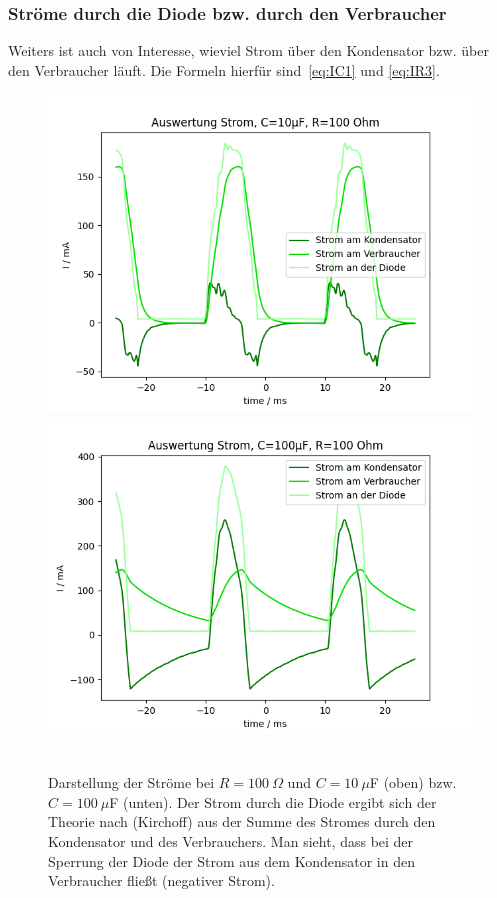 \documentclass{article}
\begin{document}
\subsubsection{Ströme durch die Diode bzw. durch den Verbraucher}

Weiters ist auch von Interesse, wieviel Strom über den Kondensator bzw. über den Verbraucher läuft. Die Formeln hierfür sind~\eqref{eq:IC1} und \eqref{eq:IR3}.



\begin{figure}[H]
\caption{Darstellung der Ströme bei $R=100~\Omega$ und $C=10~\mu$F (oben) bzw. $C=100~\mu$F (unten). Der Strom durch die Diode ergibt sich der Theorie nach (Kirchoff) aus der Summe des Stromes durch den Kondensator und des Verbrauchers. Man sieht, dass bei der Sperrung der Diode der Strom aus dem Kondensator in den Verbraucher fließt (negativer Strom).}
\label{fig:grafik_task3_auswertung2_10_und_100_R100}
{\centering
\includegraphics[scale=0.6]{bilder/task3_auswertung2_10mu_R100.png}
\includegraphics[scale=0.6]{bilder/task3_auswertung2_100mu_R100.png}
~
}
\end{figure}
\end{document}
